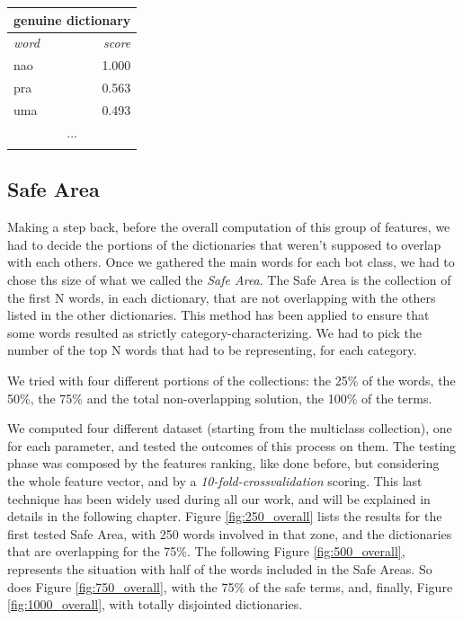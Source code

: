 \small
\begin{center}
	\begin{tabular}{lllll}
		\multicolumn{5}{c}{\textbf{genuine dictionary}} \\
		\hline\hline
		\multicolumn{4}{l}{\textit{word}} & 
		\multicolumn{1}{r}{\textit{score}}\\
		\hline\hline
		\multicolumn{4}{l}{nao} & 
		\multicolumn{1}{r}{1.000}\\
		\multicolumn{4}{l}{pra} & 
		\multicolumn{1}{r}{0.563}\\
		\multicolumn{4}{l}{uma} & 
		\multicolumn{1}{r}{0.493}\\
		\multicolumn{5}{c}{...} \\
		\hline\\
	\end{tabular}
\end{center}
\normalsize

\subsection{Safe Area}
Making a step back, before the overall computation of this group of features, we had to decide the portions of the dictionaries that weren't supposed to overlap with each others.
Once we gathered the main words for each bot class, we had to chose ths size of what we called the \textit{Safe Area}.
The Safe Area is the collection of the first N words, in each dictionary, that are not overlapping with the others listed in the other dictionaries.
This method has been applied to ensure that some words resulted as strictly category-characterizing.
We had to pick the number of the top N words that had to be representing, for each category.

We tried with four different portions of the collections: the 25\% of the words, the 50\%, the 75\% and the total non-overlapping solution, the 100\% of the terms.

We computed four different dataset (starting from the multiclass collection), one for each parameter, and tested the outcomes of this process on them. The testing phase was composed by the features ranking, like done before, but considering the whole feature vector, and by a \textit{10-fold-crossvalidation} scoring. This last technique has been widely used during all our work, and will be explained in details in the following chapter.
Figure \ref{fig:250_overall} lists the results for the first tested Safe Area, with 250 words involved in that zone, and the dictionaries that are overlapping for the 75\%. The following Figure \ref{fig:500_overall}, represents the situation with half of the words included in the Safe Areas. So does Figure \ref{fig:750_overall}, with the 75\% of the safe terms, and, finally, Figure \ref{fig:1000_overall}, with totally disjointed dictionaries.

